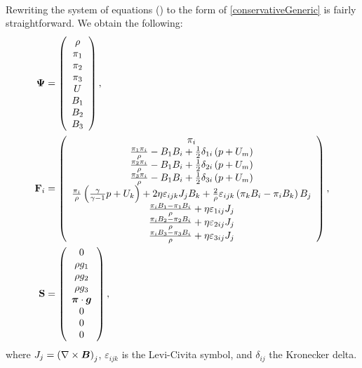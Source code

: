 \paragraph{}
Rewriting the system of equations () to the form of \cref{conservativeGeneric} is fairly straightforward.
We obtain the following:
\begin{align}
\mathrm{\mathbf{\Psi}} & =  \left(\begin{array}{c}\rho \\ \pi_1 \\ \pi_2 \\ \pi_3 \\ U \\ B_1 \\ B_2 \\ B_3 \\ \end{array}\right),\\\mathrm{\mathbf{F}}_i & =  \left(\begin{array}{c} \pi_i \\ \frac{\pi_1 \pi_i}{\rho} - B_1 B_i + \frac12 \delta_{1i} \left( p + U_m\right) \\ \frac{\pi_2 \pi_i}{\rho} - B_1 B_i + \frac12 \delta_{2i} \left( p + U_m\right) \\ \frac{\pi_3 \pi_i}{\rho} - B_1 B_i + \frac12 \delta_{3i} \left( p + U_m\right) \\ \frac{\pi_i}{\rho} \left( \frac{\gamma}{\gamma - 1} p + U_k\right) + 2\eta\varepsilon_{ijk} J_j B_k + \frac{2}{\rho} \varepsilon_{ijk} \left( \pi_k B_i - \pi_i B_k\right) B_j  \\ \frac{\pi_i B_1 - \pi_1 B_i}{\rho} + \eta \varepsilon_{1ij} J_j \\ \frac{\pi_i B_2 - \pi_2 B_i}{\rho} + \eta \varepsilon_{2ij} J_j \\ \frac{\pi_i B_3 - \pi_3 B_i}{\rho} + \eta \varepsilon_{3ij} J_j \\ \end{array}\right),\\
\mathrm{\mathbf{S}} & =  \left(\begin{array}{c}0 \\ \rho g_1 \\ \rho g_2 \\ \rho g_3 \\ \mbox{\boldmath $\pi$} \cdot \mbox{\boldmath $g$} \\ 0 \\ 0 \\ 0 \\ \end{array}\right),
\end{align}
where $J_j = \left(\nabla\times\mbox{\boldmath $B$}\right)_j$, $\varepsilon_{ijk}$ is the Levi-Civita symbol, and $\delta_{ij}$ the Kronecker delta.
